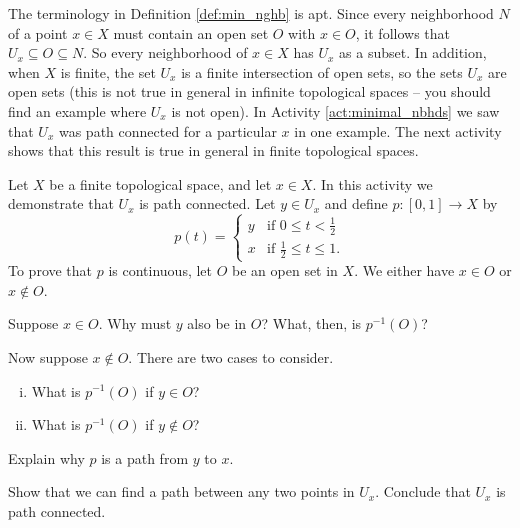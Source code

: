 \begin{comment}
	\item The answer is yes. The constant function from $[0,1]$ to $U_d$ defined by $p(x) = d$ for all $x \in [0,1]$ is a path from $d$ to $d$. There is a path $p_{bd}$ from $b$ to $d$ and a path $p_{cd}$ from $c$ to $d$. The function $p_{db}$ defined by $p_{db}(t) = p_{bd}(1-t)$ is a path from $d$ to $b$. The composite, $p_{db}p_{cd}$ is then a path from $c$ to $b$ and there is a path between any two points in $U_d$. We conclude that $U_d$ is path connected.  

	\end{enumerate}
\ea

\end{comment}

The terminology in Definition \ref{def:min_nghb} is apt. Since every neighborhood $N$ of a point $x \in X$ must contain an open set $O$ with $x \in O$, it follows that $U_x \subseteq O \subseteq N$. So every neighborhood of $x \in X$ has $U_x$ as a subset. In addition, when $X$ is finite, the set $U_x$ is a finite intersection of open sets, so the sets $U_x$ are open sets (this is not true in general in infinite topological spaces -- you should find an example where $U_x$ is not open). In Activity \ref{act:minimal_nbhds} we saw that $U_x$ was path connected for a particular $x$ in one example. The next activity shows that this result is true in general in finite topological spaces.

\begin{activity} Let $X$ be a finite topological space, and let $x \in X$. In this activity we demonstrate that $U_x$ is path connected. Let $y \in U_x$ and define $p : [0,1] \to X$ by 
\[p(t) = \begin{cases} y &\text{if } 0 \leq t < \frac{1}{2} \\ x &\text{if } \frac{1}{2} \leq t \leq 1. \end{cases}\]
To prove that $p$ is continuous, let $O$ be an open set in $X$. We either have $x \in O$ or $x \notin O$. 
\ba
\item Suppose $x \in O$. Why must $y$ also be in $O$? What, then, is $p^{-1}(O)$? 

\item Now suppose $x \notin O$. There are two cases to consider.
	\begin{enumerate}[i.]
	\item What is $p^{-1}(O)$ if $y \in O$?
		
	\item What is $p^{-1}(O)$ if $y \notin O$?
		
	\end{enumerate}

\item Explain why $p$ is a path from $y$ to $x$. 

\item Show that we can find a path between any two points in $U_x$. Conclude that $U_x$ is path connected.

\ea

\end{activity}

